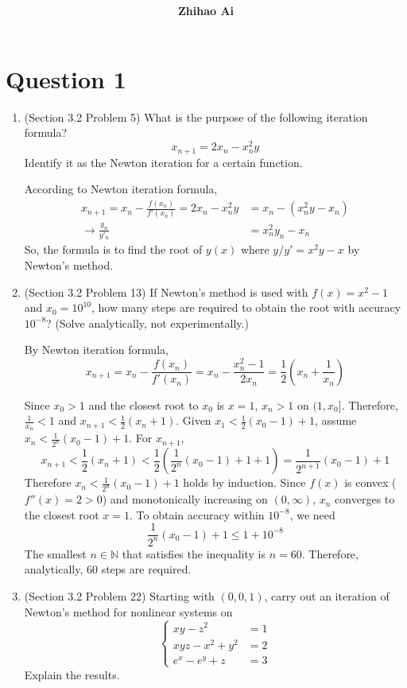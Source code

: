 \documentclass[10pt]{report}
\title{
	\vspace{2in}
	\textmd{\textbf{\hwCourse\\\hwTitle}}\\
	\vspace{0.3in}\large{\textit{\hmwkClassInstructor}}
	\vspace{3in}
}
\author{\textbf{Zhihao Ai}}
\date{}
\begin{document}
\maketitle

\section*{Question 1}
\begin{enumerate}
	\item 
	(Section 3.2 Problem 5) What is the purpose of the following iteration formula?
	\[
	x_{n+1} = 2x_n - x_n^2 y
	\]
	Identify it as the Newton iteration for a certain function.
	
	According to Newton iteration formula,
	\begin{align*}
		x_{n+1} = x_n - \frac{f(x_n)}{f'(x_n)} = 2x_n - x_n^2 y &= x_n - (x_n^2 y - x_n)\\
		\to \frac{y_n}{y'_n} &= x_n^2y_n - x_n
	\end{align*}
	So, the formula is to find the root of $y(x)$ where $y/y' = x^2y - x$ by Newton's method.
	
	\item 
	(Section 3.2 Problem 13) If Newton's method is used with $f(x)=x^2-1$ and $x_0 = 10^{10}$, how many steps are required to obtain the root with accuracy $10^{-8}$? (Solve analytically, not experimentally.)
	
	By Newton iteration formula,
	\[
	x_{n+1} 
	= x_n - \frac{f(x_n)}{f'(x_n)} 
	= x_n - \frac{x_n^2 - 1}{2x_n} 
	= \frac{1}{2}\left(x_n + \frac{1}{x_n}\right)
	\]
	
	Since $x_0 > 1$ and the closest root to $x_0$ is $x = 1$, $x_{n} > 1$ on $(1, x_0]$. Therefore, $\frac{1}{x_n} < 1$ and $x_{n+1} < \frac{1}{2}(x_n + 1)$.
	Given $x_1 < \frac{1}{2} (x_0-1) + 1$, assume $x_n < \frac{1}{2^n}(x_0 - 1) + 1$. For $x_{n+1}$,
	\[
	x_{n+1} 
	< \frac{1}{2}(x_n + 1) 
	< \frac{1}{2}\left(\frac{1}{2^n}(x_0 - 1) + 1 + 1\right) 
	= \frac{1}{2^{n+1}}(x_0 - 1) + 1
	\]
	Therefore $ x_n < \frac{1}{2^n}(x_0 - 1) + 1$ holds by induction. Since $f(x)$ is convex ($f''(x) = 2 > 0$) and monotonically increasing on $(0,\infty)$, $x_n$ converges to the closest root $x=1$. To obtain accuracy within  $10^{-8}$, we need
	\[
	\frac{1}{2^n}(x_0 - 1) + 1 \le 1 + 10^{-8}
	\]
	The smallest $n\in\mathbb{N}$ that satisfies the inequality is $n=60$. Therefore, analytically, 60 steps are required.
	
	\item 
	(Section 3.2 Problem 22) Starting with $(0,0,1)$, carry out an iteration of Newton's method for nonlinear systems on
	\[
	\left\{
	\begin{aligned}
	xy - z^2 &= 1\\
	xyz- x^2 + y^2 &= 2\\
	e^x - e^y + z &= 3
	\end{aligned}
	\right.
	\]
	Explain the results.
	

\end{enumerate}
\end{document}
